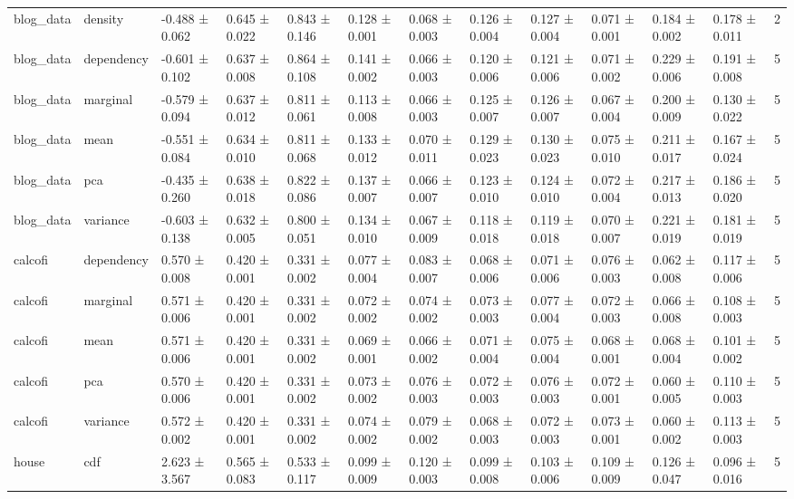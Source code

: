 \begin{table}
\begin{tabular}{llllllllllllr}
blog_data & density & -0.488 ± 0.062 & 0.645 ± 0.022 & 0.843 ± 0.146 & 0.128 ± 0.001 & 0.068 ± 0.003 & 0.126 ± 0.004 & 0.127 ± 0.004 & 0.071 ± 0.001 & 0.184 ± 0.002 & 0.178 ± 0.011 & 2 \\
blog_data & dependency & -0.601 ± 0.102 & 0.637 ± 0.008 & 0.864 ± 0.108 & 0.141 ± 0.002 & 0.066 ± 0.003 & 0.120 ± 0.006 & 0.121 ± 0.006 & 0.071 ± 0.002 & 0.229 ± 0.006 & 0.191 ± 0.008 & 5 \\
blog_data & marginal & -0.579 ± 0.094 & 0.637 ± 0.012 & 0.811 ± 0.061 & 0.113 ± 0.008 & 0.066 ± 0.003 & 0.125 ± 0.007 & 0.126 ± 0.007 & 0.067 ± 0.004 & 0.200 ± 0.009 & 0.130 ± 0.022 & 5 \\
blog_data & mean & -0.551 ± 0.084 & 0.634 ± 0.010 & 0.811 ± 0.068 & 0.133 ± 0.012 & 0.070 ± 0.011 & 0.129 ± 0.023 & 0.130 ± 0.023 & 0.075 ± 0.010 & 0.211 ± 0.017 & 0.167 ± 0.024 & 5 \\
blog_data & pca & -0.435 ± 0.260 & 0.638 ± 0.018 & 0.822 ± 0.086 & 0.137 ± 0.007 & 0.066 ± 0.007 & 0.123 ± 0.010 & 0.124 ± 0.010 & 0.072 ± 0.004 & 0.217 ± 0.013 & 0.186 ± 0.020 & 5 \\
blog_data & variance & -0.603 ± 0.138 & 0.632 ± 0.005 & 0.800 ± 0.051 & 0.134 ± 0.010 & 0.067 ± 0.009 & 0.118 ± 0.018 & 0.119 ± 0.018 & 0.070 ± 0.007 & 0.221 ± 0.019 & 0.181 ± 0.019 & 5 \\
calcofi & dependency & 0.570 ± 0.008 & 0.420 ± 0.001 & 0.331 ± 0.002 & 0.077 ± 0.004 & 0.083 ± 0.007 & 0.068 ± 0.006 & 0.071 ± 0.006 & 0.076 ± 0.003 & 0.062 ± 0.008 & 0.117 ± 0.006 & 5 \\
calcofi & marginal & 0.571 ± 0.006 & 0.420 ± 0.001 & 0.331 ± 0.002 & 0.072 ± 0.002 & 0.074 ± 0.002 & 0.073 ± 0.003 & 0.077 ± 0.004 & 0.072 ± 0.003 & 0.066 ± 0.008 & 0.108 ± 0.003 & 5 \\
calcofi & mean & 0.571 ± 0.006 & 0.420 ± 0.001 & 0.331 ± 0.002 & 0.069 ± 0.001 & 0.066 ± 0.002 & 0.071 ± 0.004 & 0.075 ± 0.004 & 0.068 ± 0.001 & 0.068 ± 0.004 & 0.101 ± 0.002 & 5 \\
calcofi & pca & 0.570 ± 0.006 & 0.420 ± 0.001 & 0.331 ± 0.002 & 0.073 ± 0.002 & 0.076 ± 0.003 & 0.072 ± 0.003 & 0.076 ± 0.003 & 0.072 ± 0.001 & 0.060 ± 0.005 & 0.110 ± 0.003 & 5 \\
calcofi & variance & 0.572 ± 0.002 & 0.420 ± 0.001 & 0.331 ± 0.002 & 0.074 ± 0.002 & 0.079 ± 0.002 & 0.068 ± 0.003 & 0.072 ± 0.003 & 0.073 ± 0.001 & 0.060 ± 0.002 & 0.113 ± 0.003 & 5 \\
house & cdf & 2.623 ± 3.567 & 0.565 ± 0.083 & 0.533 ± 0.117 & 0.099 ± 0.009 & 0.120 ± 0.003 & 0.099 ± 0.008 & 0.103 ± 0.006 & 0.109 ± 0.009 & 0.126 ± 0.047 & 0.096 ± 0.016 & 5 \\

\end{tabular}
\end{table}
